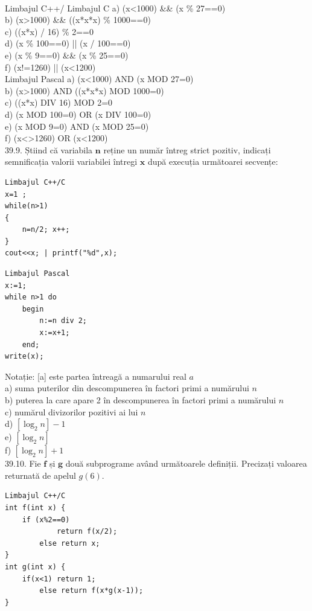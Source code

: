 \begin{itemize}
\begin{enumerate}
\\
Limbajul C++/ Limbajul C
a) (x<1000) \&\& (x \% 27==0)
\\
b) (x>1000) \&\& ((x*x*x) \% 1000==0)
\\
c) ((x*x) / 16) \% 2==0
\\
d) (x \% 100==0) || (x / 100==0)
\\
e) (x \% 9==0) \&\& (x \% 25==0)
\\
f) (x!=1260) || (x<1200)
\\
Limbajul Pascal
a) (x<1000) AND (x MOD 27=0)
\\
b) (x>1000) AND ((x*x*x) MOD 1000=0)
\\
c) ((x*x) DIV 16) MOD 2=0
\\
d) (x MOD 100=0) OR (x DIV 100=0)
\\
e) (x MOD 9=0) AND (x MOD 25=0)
\\
f) (x<>1260) OR (x<1200)
\\
39.9. Știind că variabila $\mathbf{n}$ reține un număr întreg strict pozitiv, indicați semnificația valorii variabilei întregi $\mathbf{x}$ după execuția următoarei secvențe:
\begin{verbatim}
Limbajul C++/C
x=1 ;
while(n>1)
{
    n=n/2; x++;
}
cout<<x; | printf("%d",x);
\end{verbatim}
\begin{verbatim}
Limbajul Pascal
x:=1;
while n>1 do
    begin
        n:=n div 2;
        x:=x+1;
    end;
write(x);
\end{verbatim}
Notație: [a] este partea întreagă a numarului real $a$
\\
a) suma puterilor din descompunerea în factori primi a numărului $n$
\\
b) puterea la care apare 2 în descompunerea în factori primi a numărului $n$
\\
c) numărul divizorilor pozitivi ai lui $n$
\\
d) $[\log _{2} n]-1$
\\
e) $[\log _{2} n]$
\\
f) $[\log _{2} n]+1$
\\
39.10. Fie $\mathbf{f}$ și $\mathbf{g}$ două subprograme având următoarele definiții. Precizați valoarea returnată de apelul $g(6)$.
\begin{verbatim}
Limbajul C++/C
int f(int x) {
    if (x%2==0)
            return f(x/2);
        else return x;
}
int g(int x) {
    if(x<1) return 1;
        else return f(x*g(x-1));
}
\end{verbatim}
\begin{verbatim}

\end{verbatim}
\end{enumerate}
\end{itemize}
